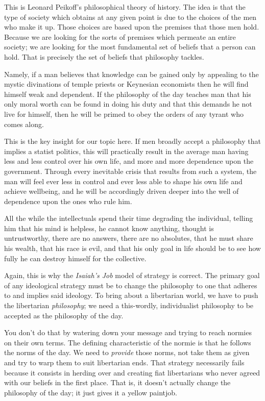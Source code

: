 \documentclass[11pt]{article}
\begin{document}
This is Leonard Peikoff's philosophical theory of history. The idea is that the type of society which obtains at any given point is due to the choices of the men who make it up. Those choices are based upon the premises that those men hold. Because we are looking for the sorts of premises which permeate an entire society; we are looking for the most fundamental set of beliefs that a person can hold. That is precisely the set of beliefs that philosophy tackles.

Namely, if a man believes that knowledge can be gained only by appealing to the mystic divinations of temple priests or Keynesian economists then he will find himself weak and dependent. If the philosophy of the day teaches man that his only moral worth can be found in doing his duty and that this demands he not live for himself, then he will be primed to obey the orders of any tyrant who comes along.

This is the key insight for our topic here. If men broadly accept a philosophy that implies a statist politics, this will practically result in the average man having less and less control over his own life, and more and more dependence upon the government. Through every inevitable crisis that results from such a system, the man will feel ever less in control and ever less able to shape his own life and achieve wellbeing, and he will be accordingly driven deeper into the well of dependence upon the ones who rule him.

All the while the intellectuals spend their time degrading the individual, telling him that his mind is helpless, he cannot know anything, thought is untrustworthy, there are no answers, there are no absolutes, that he must share his wealth, that his race is evil, and that his only goal in life should be to see how fully he can destroy himself for the collective.

Again, this is why the \emph{Isaiah's Job} model of strategy is correct. The primary goal of any ideological strategy must be to change the philosophy to one that adheres to and implies said ideology. To bring about a libertarian world, we have to push the libertarian \emph{philosophy}; we need a this-wordly, individualist philosophy to be accepted as the philosophy of the day.

You don't do that by watering down your message and trying to reach normies on their own terms. The defining characteristic of the normie is that he follows the norms of the day. We need to \emph{provide} those norms, not take them as given and try to warp them to suit libertarian ends. That strategy necessarily fails because it consists in herding over and creating fiat libertarians who never agreed with our beliefs in the first place. That is, it doesn't actually change the philosophy of the day; it just gives it a yellow paintjob.
\end{document}
